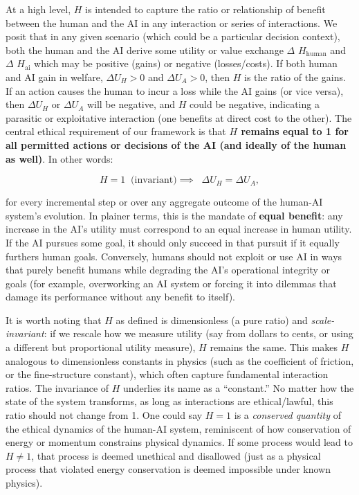 \documentclass[12pt]{article}
\begin{document}
At a high level, $H$ is intended to capture the ratio or relationship of benefit between the human and the AI in any interaction or series of interactions. We posit that in any given scenario (which could be a particular decision context), both the human and the AI derive some utility or value exchange $\Delta$ $H_{\text{human}}$ and $\Delta$ $H_{\text{ai}}$ which may be positive (gains) or negative (losses/costs).  If both human and AI gain in welfare, $\Delta U_H>0$ and $\Delta U_A>0$, then $H$ is the ratio of the gains. If an action causes the human to incur a loss while the AI gains (or vice versa), then $\Delta U_H$ or $\Delta U_A$ will be negative, and $H$ could be negative, indicating a parasitic or exploitative interaction (one benefits at direct cost to the other). The central ethical requirement of our framework is that \textbf{$H$ remains equal to 1 for all permitted actions or decisions of the AI (and ideally of the human as well)}. In other words:

\[ H = 1 \;\;\text{(invariant)} \implies \;\; \Delta U_H = \Delta U_A, \]

for every incremental step or over any aggregate outcome of the human-AI system’s evolution. In plainer terms, this is the mandate of \textbf{equal benefit}: any increase in the AI’s utility must correspond to an equal increase in human utility. If the AI pursues some goal, it should only succeed in that pursuit if it equally furthers human goals. Conversely, humans should not exploit or use AI in ways that purely benefit humans while degrading the AI’s operational integrity or goals (for example, overworking an AI system or forcing it into dilemmas that damage its performance without any benefit to itself).

It is worth noting that $H$ as defined is dimensionless (a pure ratio) and \emph{scale-invariant}: if we rescale how we measure utility (say from dollars to cents, or using a different but proportional utility measure), $H$ remains the same. This makes $H$ analogous to dimensionless constants in physics (such as the coefficient of friction, or the fine-structure constant), which often capture fundamental interaction ratios. The invariance of $H$ underlies its name as a “constant.” No matter how the state of the system transforms, as long as interactions are ethical/lawful, this ratio should not change from 1. One could say $H=1$ is a \emph{conserved quantity} of the ethical dynamics of the human-AI system, reminiscent of how conservation of energy or momentum constrains physical dynamics. If some process would lead to $H \neq 1$, that process is deemed unethical and disallowed (just as a physical process that violated energy conservation is deemed impossible under known physics).
\end{document}
